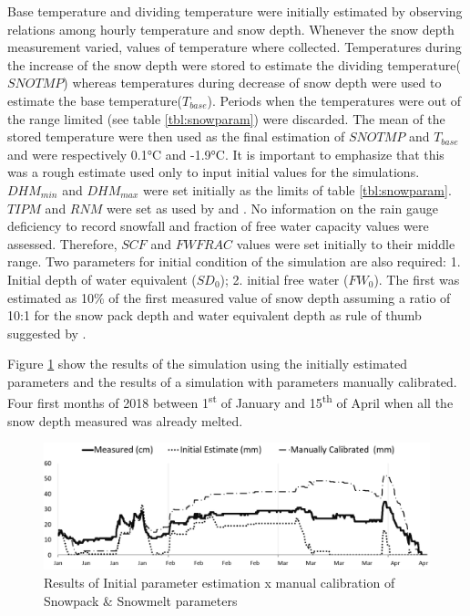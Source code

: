 Base temperature and dividing temperature were initially estimated by observing relations among hourly temperature and snow depth. Whenever the snow depth measurement varied, values of temperature where collected. Temperatures during the increase of the snow depth were stored to estimate the dividing temperature($SNOTMP$) whereas temperatures during decrease of snow depth were used to estimate the base temperature($T_{base}$). Periods when the temperatures were out of the range limited (see table \ref{tbl:snowparam}) were discarded. The mean of the stored temperature were then used as the final estimation of $SNOTMP$ and $T_{base}$ and were respectively  0.1°C and -1.9°C. It is important to emphasize that this was a rough estimate used only to input initial values for the simulations. $DHM_{min}$ and $DHM_{max}$ were set initially as the limits of table \ref{tbl:snowparam}. $TIPM$ and $RNM$ were set as used by \citet{Rossman2016} and \citet{anderson1973}. No information on the rain gauge deficiency to record snowfall and fraction of free water capacity values were assessed. Therefore, $SCF$ and $FWFRAC$ values were set initially to their middle range. Two parameters for initial condition of the simulation are also required: 1. Initial depth of water equivalent ($SD_0$); 2. initial free water ($FW_0$). The first was estimated as 10\% of the first measured value of snow depth assuming a ratio of 10:1 for the snow pack depth and water equivalent depth as rule of thumb suggested by \citet{Rossman2016}.
    
Figure \ref{fig:snow1sim} show the results of the simulation using the initially estimated parameters and the results of a simulation with parameters manually calibrated. Four first months of 2018 between 1\textsuperscript{st} of January and 15\textsuperscript{th} of April when all the snow depth measured was already melted.

\begin{figure}[h]
    \centering
	\includegraphics[scale=0.55]{figures/snowdepth_1st_simulations.png}
	\caption{Results of Initial parameter estimation x manual calibration of Snowpack \& Snowmelt parameters}
	\label{fig:snow1sim}
\end{figure}
    
